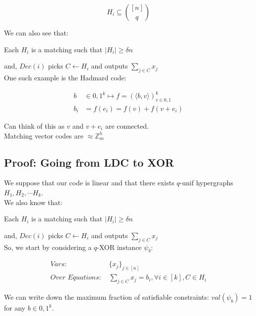 \documentclass{article}
\begin{document}
\begin{equation*}
H_i \subseteq {[n] \choose q}
\end{equation*}

\noindent We can also see that:

\noindent Each $H_i$ is a matching such that $|H_i| \geq \delta n$

\noindent and, $Dec(i)$ picks $C \leftarrow H_i$ and outputs $\sum_{j \in C} x_j$\\

\noindent One such example is the Hadmard code:

\begin{equation}
\begin{split}
b &\in {0,1}^k \mapsto f = (\langle b, v \rangle)_{v \in {0,1}}^k\\
b_i &= f(e_i) = f(v) + f(v+e_i)
\end{split}
\end{equation}

\noindent Can think of this as $v$ and $v+e_i$ are connected.\\

\noindent Matching vector codes are $\approx \mathbb{Z} _{m}^{h}$

\subsection{Proof: Going from LDC to XOR}

We suppose that our code is linear and that there exists $q$-unif hypergraphs ${H_1, H_2, \cdots H_k}$.\\

\noindent We also know that:

Each $H_i$ is a matching such that $|H_i| \geq \delta n$

and, $Dec(i)$ picks $C \leftarrow H_i$ and outputs $\sum_{j \in C} x_j$\\

\noindent So, we start by considering a $q$-XOR instance $\psi_b$:

\begin{equation*}
\begin{split}
    \textit{Vars: } & \{x_j\}_{j \in [n]}\\
    \textit{Over Equations: } & \sum_{j \in C} x_j = b_i, \forall i \in [k], C \in H_i
\end{split}
\end{equation*}

\noindent We can write down the maximum fraction of satisfiable constraints: $val(\psi_b) = 1$ for any $b \in {0,1}^k$.\\
\end{document}
